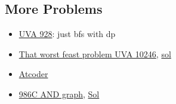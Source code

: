 \documentclass[8pt, a4paper, oneside, twocolumn]{extarticle}
\begin{document}
\subsection{More Problems}
\begin{itemize}
    \item \href{}{UVA 928}: just bfs with dp
    \item \href{https://uva.onlinejudge.org/external/102/10246.pdf}{That worst feast problem UVA 10246}, \href{https://gist.github.com/sourabh2311/e55a0e3f7453e4514f1251b1ae6f0827}{sol}
    \item \href{https://gist.github.com/sourabh2311/a9f9b7584631b8859692df0f4af0843d}{Atcoder}
    \item \href{https://codeforces.com/problemset/problem/986/C}{986C AND graph}, \href{https://codeforces.com/blog/entry/59758}{Sol}
\end{itemize}
\end{document}
